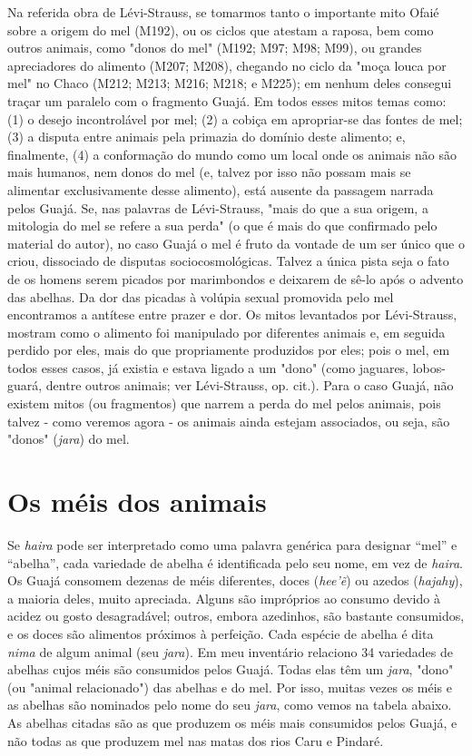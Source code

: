 Na referida obra de Lévi-Strauss, se tomarmos tanto o importante mito
Ofaié sobre a origem do mel (M192), ou os ciclos que atestam a raposa,
bem como outros animais, como "donos do mel" (M192; M97; M98; M99), ou
grandes apreciadores do alimento (M207; M208), chegando no ciclo da
"moça louca por mel" no Chaco (M212; M213; M216; M218; e M225); em
nenhum deles consegui traçar um paralelo com o fragmento Guajá. Em todos
esses mitos temas como: (1) o desejo incontrolável por mel; (2) a cobiça
em apropriar-se das fontes de mel; (3) a disputa entre animais pela
primazia do domínio deste alimento; e, finalmente, (4) a conformação do
mundo como um local onde os animais não são mais humanos, nem donos do
mel (e, talvez por isso não possam mais se alimentar exclusivamente
desse alimento), está ausente da passagem narrada pelos Guajá. Se, nas
palavras de Lévi-Strauss, "mais do que a sua origem, a mitologia do mel
se refere a sua perda" (o que é mais do que confirmado pelo material do
autor), no caso Guajá o mel é fruto da vontade de um ser único que o
criou, dissociado de disputas sociocosmológicas. Talvez a única pista
seja o fato de os homens serem picados por marimbondos e deixarem de
sê-lo após o advento das abelhas. Da dor das picadas à volúpia sexual
promovida pelo mel encontramos a antítese entre prazer e dor. Os mitos
levantados por Lévi-Strauss, mostram como o alimento foi manipulado por
diferentes animais e, em seguida perdido por eles, mais do que
propriamente produzidos por eles; pois o mel, em todos esses casos, já
existia e estava ligado a um "dono" (como jaguares, lobos-guará, dentre
outros animais; ver Lévi-Strauss, op. cit.). Para o caso Guajá, não
existem mitos (ou fragmentos) que narrem a perda do mel pelos animais,
pois talvez - como veremos agora - os animais ainda estejam associados,
ou seja, são "donos" (\emph{jara}) do mel.

\section{Os méis dos animais}

Se \emph{haira} pode ser interpretado como uma palavra genérica para
designar ``mel'' e ``abelha'', cada variedade de abelha é identificada
pelo seu nome, em vez de \emph{haira}. Os Guajá consomem dezenas de méis
diferentes, doces (\emph{hee'ẽ}) ou azedos (\emph{hajahy}), a maioria
deles, muito apreciada. Alguns são impróprios ao consumo devido à acidez
ou gosto desagradável; outros, embora azedinhos, são bastante
consumidos, e os doces são alimentos próximos à perfeição. Cada espécie
de abelha é dita \emph{nima} de algum animal (seu \emph{jara}). Em meu
inventário relaciono 34 variedades de abelhas cujos méis são consumidos
pelos Guajá. Todas elas têm um \emph{jara}, "dono" (ou "animal
relacionado") das abelhas e do mel. Por isso, muitas vezes os méis e as
abelhas são nominados pelo nome do seu \emph{jara}, como vemos na tabela
abaixo. As abelhas citadas são as que produzem os méis mais consumidos
pelos Guajá, e não todas as que produzem mel nas matas dos rios Caru e
Pindaré.

